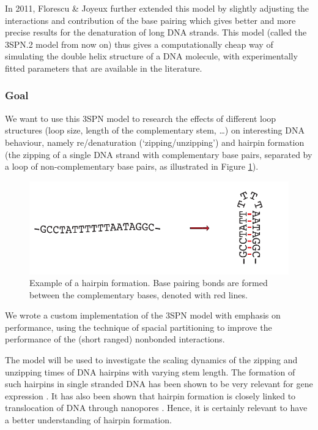 In 2011, Florescu \& Joyeux \cite{florescu2011thermal} further extended this model by slightly adjusting the interactions and contribution of the base pairing which gives better and more precise results for the denaturation of long DNA strands. This model (called the 3SPN.2 model from now on) thus gives a computationally cheap way of simulating the double helix structure of a DNA molecule, with experimentally fitted parameters that are available in the literature.



\subsubsection*{Goal}

We want to use this 3SPN model to research the effects of different loop structures (loop size, length of the complementary stem, \ldots) on interesting DNA behaviour, namely re/denaturation (`zipping/unzipping') and hairpin formation (the zipping of a single DNA strand with complementary base pairs, separated by a loop of non-complementary base pairs, as illustrated in Figure \ref{hairpin_example}).
\begin{figure}[h]
\includegraphics{images/hairpin_example}
\caption{Example of a hairpin formation. Base pairing bonds are formed between the complementary bases, denoted with red lines.}\label{hairpin_example}
\end{figure}
We wrote a custom implementation of the 3SPN model with emphasis on performance, using the technique of spacial partitioning \cite{plimpton1995fast} to improve the performance of the (short ranged) nonbonded interactions.

The model will be used to investigate the scaling dynamics of the zipping and unzipping times of DNA hairpins with varying stem length. The formation of such hairpins in single stranded DNA has been shown to be very relevant for gene expression \cite{oettinger2000hairpins}. It has also been shown that hairpin formation is closely linked to translocation of DNA through nanopores \cite{carlon2011anomalous}. Hence, it is certainly relevant to have a better understanding of hairpin formation.

